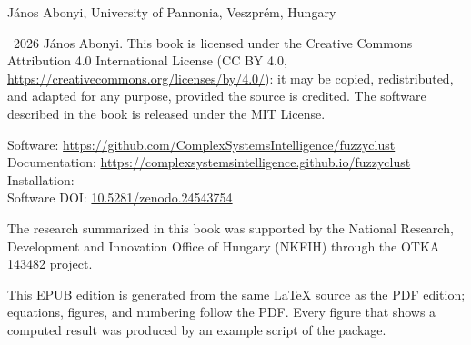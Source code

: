 \maketitle
\begin{center}\small
J\'anos Abonyi, University of Pannonia, Veszpr\'em, Hungary
\end{center}

{\small\noindent\textcopyright~2026 J\'anos Abonyi. This book is licensed under the Creative Commons Attribution 4.0 International License (CC BY 4.0, \url{https://creativecommons.org/licenses/by/4.0/}): it may be copied, redistributed, and adapted for any purpose, provided the source is credited. The  software described in the book is released under the MIT License.

\noindent Software: \url{https://github.com/ComplexSystemsIntelligence/fuzzyclust}\\
Documentation: \url{https://complexsystemsintelligence.github.io/fuzzyclust}\\
Installation: \\
Software DOI: \href{https://doi.org/10.5281/zenodo.24543754}{10.5281/zenodo.24543754}

\noindent The research summarized in this book was supported by the National Research, Development and Innovation Office of Hungary (NKFIH) through the OTKA 143482 project.

\noindent This EPUB edition is generated from the same LaTeX source as the PDF edition; equations, figures, and numbering follow the PDF. Every figure that shows a computed result was produced by an example script of the package.\par}
